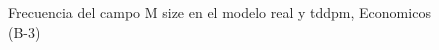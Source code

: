 \begin{figure}[H]
    \centering
    
    \caption{Frecuencia del campo M size en el modelo real y tddpm, Economicos (B-3)}
    \label{frecuency-M Size-tddpm_mlp}
\end{figure}